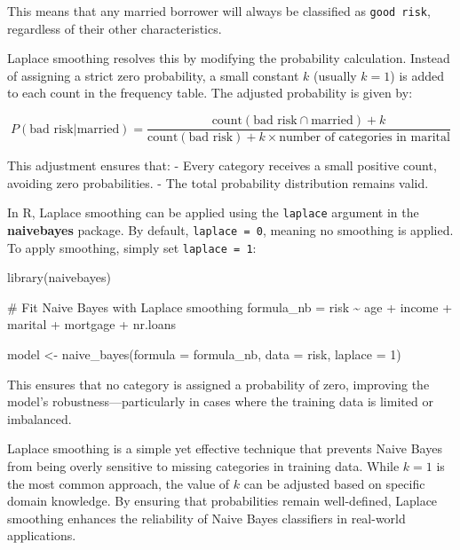\documentclass[
  11pt,
]{book}
\makeatletter
\newenvironment{Shaded}{}{}
\newcommand{\AttributeTok}[1]{#1}
\newcommand{\CommentTok}[1]{\textcolor[rgb]{0.36,0.36,0.36}{#1}}
\newcommand{\DecValTok}[1]{#1}
\newcommand{\FunctionTok}[1]{#1}
\newcommand{\NormalTok}[1]{#1}
\newcommand{\OtherTok}[1]{\textcolor[rgb]{0.39,0.39,0.39}{#1}}
\newcommand{\SpecialCharTok}[1]{\textcolor[rgb]{0.39,0.39,0.39}{#1}}
\newenvironment{kframe}{%
\medskip{}
\setlength{\fboxsep}{.8em}
 \def\at@end@of@kframe{}%
 \ifinner\ifhmode%
  \def\at@end@of@kframe{\end{minipage}}%
  \begin{minipage}{\columnwidth}%
 \fi\fi%
 \def\FrameCommand##1{\hskip\@totalleftmargin \hskip-\fboxsep
 \colorbox{shadecolor}{##1}\hskip-\fboxsep
     \hskip-\linewidth \hskip-\@totalleftmargin \hskip\columnwidth}%
 \MakeFramed {\advance\hsize-\width
   \@totalleftmargin\z@ \linewidth\hsize
   \@setminipage}}%
 {\par\unskip\endMakeFramed%
 \at@end@of@kframe}
\renewenvironment{Shaded}{\begin{kframe}}{\end{kframe}}
\theoremstyle{definition}
\theoremstyle{definition}
\theoremstyle{definition}
\theoremstyle{definition}
\theoremstyle{remark}
\makeatother
\begin{document}
This means that any married borrower will always be classified as \texttt{good\ risk}, regardless of their other characteristics.

Laplace smoothing resolves this by modifying the probability calculation. Instead of assigning a strict zero probability, a small constant \(k\) (usually \(k = 1\)) is added to each count in the frequency table. The adjusted probability is given by:

\[
P(\text{bad risk} | \text{married}) = \frac{\text{count}(\text{bad risk} \cap \text{married}) + k}{\text{count}(\text{bad risk}) + k \times \text{number of categories in } \text{marital}}
\]

This adjustment ensures that:
- Every category receives a small positive count, avoiding zero probabilities.
- The total probability distribution remains valid.

In R, Laplace smoothing can be applied using the \texttt{laplace} argument in the \textbf{naivebayes} package. By default, \texttt{laplace\ =\ 0}, meaning no smoothing is applied. To apply smoothing, simply set \texttt{laplace\ =\ 1}:

\begin{Shaded}
\begin{Highlighting}[]
\FunctionTok{library}\NormalTok{(naivebayes)}

\CommentTok{\# Fit Naive Bayes with Laplace smoothing}
\NormalTok{formula\_nb }\OtherTok{=}\NormalTok{ risk }\SpecialCharTok{\textasciitilde{}}\NormalTok{ age }\SpecialCharTok{+}\NormalTok{ income }\SpecialCharTok{+}\NormalTok{ marital }\SpecialCharTok{+}\NormalTok{ mortgage }\SpecialCharTok{+}\NormalTok{ nr.loans}

\NormalTok{model }\OtherTok{\textless{}{-}} \FunctionTok{naive\_bayes}\NormalTok{(}\AttributeTok{formula =}\NormalTok{ formula\_nb, }\AttributeTok{data =}\NormalTok{ risk, }\AttributeTok{laplace =} \DecValTok{1}\NormalTok{)}
\end{Highlighting}
\end{Shaded}

This ensures that no category is assigned a probability of zero, improving the model's robustness---particularly in cases where the training data is limited or imbalanced.

Laplace smoothing is a simple yet effective technique that prevents Naive Bayes from being overly sensitive to missing categories in training data. While \(k = 1\) is the most common approach, the value of \(k\) can be adjusted based on specific domain knowledge. By ensuring that probabilities remain well-defined, Laplace smoothing enhances the reliability of Naive Bayes classifiers in real-world applications.
\end{document}
